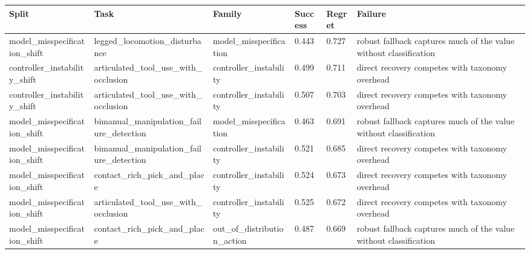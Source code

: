 \begin{tabular}{llllll}
\toprule
Split & Task & Family & Success & Regret & Failure \\
\midrule
model\_misspecification\_shift & legged\_locomotion\_disturbance & model\_misspecification & 0.443 & 0.727 & robust fallback captures much of the value without classification \\
controller\_instability\_shift & articulated\_tool\_use\_with\_occlusion & controller\_instability & 0.499 & 0.711 & direct recovery competes with taxonomy overhead \\
controller\_instability\_shift & articulated\_tool\_use\_with\_occlusion & controller\_instability & 0.507 & 0.703 & direct recovery competes with taxonomy overhead \\
model\_misspecification\_shift & bimanual\_manipulation\_failure\_detection & model\_misspecification & 0.463 & 0.691 & robust fallback captures much of the value without classification \\
model\_misspecification\_shift & bimanual\_manipulation\_failure\_detection & controller\_instability & 0.521 & 0.685 & direct recovery competes with taxonomy overhead \\
model\_misspecification\_shift & contact\_rich\_pick\_and\_place & controller\_instability & 0.524 & 0.673 & direct recovery competes with taxonomy overhead \\
model\_misspecification\_shift & articulated\_tool\_use\_with\_occlusion & controller\_instability & 0.525 & 0.672 & direct recovery competes with taxonomy overhead \\
model\_misspecification\_shift & contact\_rich\_pick\_and\_place & out\_of\_distribution\_action & 0.487 & 0.669 & robust fallback captures much of the value without classification \\
\bottomrule
\end{tabular}
